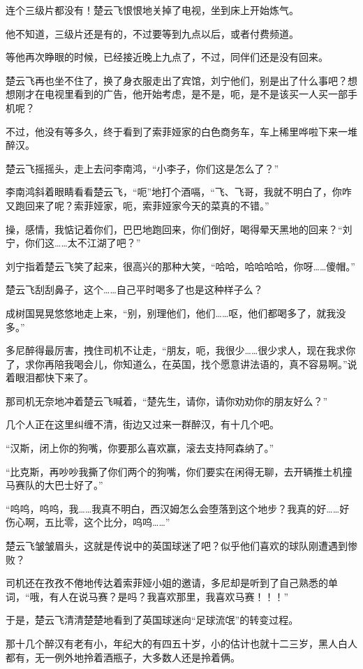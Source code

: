 连个三级片都没有！楚云飞恨恨地关掉了电视，坐到床上开始炼气。

他不知道，三级片还是有的，不过要等到九点以后，或者付费频道。

等他再次睁眼的时候，已经接近晚上九点了，不过，同伴们还是没有回来。

楚云飞再也坐不住了，换了身衣服走出了宾馆，刘宁他们，别是出了什么事吧？想想刚才在电视里看到的广告，他开始考虑，是不是，呃，是不是该买一人买一部手机呢？

不过，他没有等多久，终于看到了索菲娅家的白色商务车，车上稀里哗啦下来一堆醉汉。

楚云飞摇摇头，走上去问李南鸿，“小李子，你们这是怎么了？”

李南鸿斜着眼睛看看楚云飞，“呃”地打个酒嗝，“飞、飞哥，我就不明白了，你咋又跑回来了呢？索菲娅家，呃，索菲娅家今天的菜真的不错。”

操，感情，我惦记着你们，巴巴地跑回来，你们倒好，喝得晕天黑地的回来？“刘宁，你们这……太不江湖了吧？”

刘宁指着楚云飞笑了起来，很高兴的那种大笑，“哈哈，哈哈哈哈，你呀……傻帽。”

楚云飞刮刮鼻子，这个……自己平时喝多了也是这种样子么？

成树国晃晃悠悠地走上来，“别，别理他们，他们……呕，他们都喝多了，就我没多。”

多尼醉得最厉害，拽住司机不让走，“朋友，呃，我很少……很少求人，现在我求你了，求你再陪我喝会儿，你知道么，在英国，找个愿意讲法语的，真不容易啊。”说着眼泪都快下来了。

那司机无奈地冲着楚云飞喊着，“楚先生，请你，请你劝劝你的朋友好么？”

几个人正在这里纠缠不清，街边又过来一群醉汉，有十几个吧。

“汉斯，闭上你的狗嘴，你要那么喜欢赢，滚去支持阿森纳了。”

“比克斯，再吵吵我撕了你们两个的狗嘴，你们要实在闲得无聊，去开辆推土机撞马赛队的大巴士好了。”

“呜呜，呜呜，我……我真不明白，西汉姆怎么会堕落到这个地步？我真的好……好伤心啊，五比零，这个比分，呜呜……”

楚云飞皱皱眉头，这就是传说中的英国球迷了吧？似乎他们喜欢的球队刚遭遇到惨败？

司机还在孜孜不倦地传达着索菲娅小姐的邀请，多尼却是听到了自己熟悉的单词，“哦，有人在说马赛？是吗？我喜欢那里，我喜欢马赛！！！”

于是，楚云飞清清楚楚地看到了英国球迷向“足球流氓”的转变过程。

那十几个醉汉有老有小，年纪大的有四五十岁，小的估计也就十二三岁，黑人白人都有，无一例外地拎着酒瓶子，大多数人还是拎着俩。

